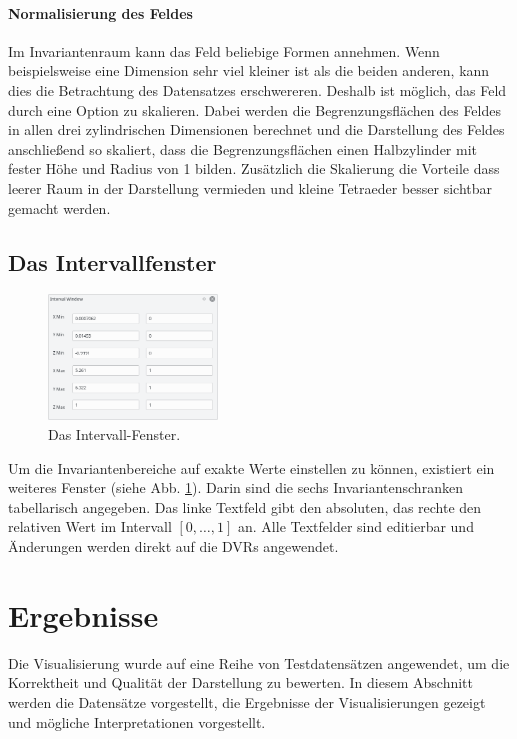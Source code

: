 \documentclass[a4paper,fontsize=12pt,toc=bib,halfparskip]{scrartcl}
\begin{document}
\paragraph{Normalisierung des Feldes}
Im Invariantenraum kann das Feld beliebige Formen annehmen. Wenn beispielsweise eine Dimension sehr viel kleiner ist als die beiden anderen, kann dies die Betrachtung des Datensatzes erschwereren. Deshalb ist m\"oglich, das Feld durch eine Option zu skalieren. Dabei werden die Begrenzungsfl\"achen des Feldes in allen drei zylindrischen Dimensionen berechnet und die Darstellung des Feldes anschlie{\ss}end so skaliert, dass die Begrenzungsfl\"achen einen Halbzylinder mit fester H\"ohe und Radius von 1 bilden. Zus\"atzlich die Skalierung die Vorteile dass leerer Raum in der Darstellung vermieden und kleine Tetraeder besser sichtbar gemacht werden.

\subsection{Das Intervallfenster}
\begin{figure}
	\centering
	\includegraphics[width=0.4\textwidth]{pictures/IntervalWindow.png}
	\caption{Das Intervall-Fenster.}
	\label{IntervalWindow}
\end{figure}
Um die Invariantenbereiche auf exakte Werte einstellen zu k\"onnen, existiert ein weiteres Fenster (siehe Abb. \ref{IntervalWindow}). Darin sind die sechs Invariantenschranken tabellarisch angegeben. Das linke Textfeld gibt den absoluten, das rechte den relativen Wert im Intervall $[0,\dots,1]$ an. Alle Textfelder sind editierbar und \"Anderungen werden direkt auf die DVRs angewendet.

\section{Ergebnisse}
\label{sec:Ergebnisse}
Die Visualisierung wurde auf eine Reihe von Testdatens\"atzen angewendet, um die Korrektheit und Qualit\"at der Darstellung zu bewerten. In diesem Abschnitt werden die Datens\"atze vorgestellt, die Ergebnisse der Visualisierungen gezeigt und m\"ogliche Interpretationen vorgestellt.
\end{document}
